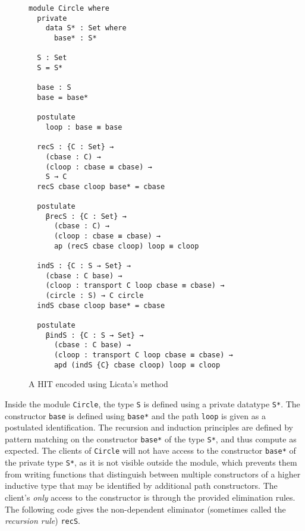 \documentclass[sigplan,10pt]{acmart}
\begin{document}
\begin{figure}
\begin{center}
\begingroup
\begin{Verbatim}
module Circle where
  private
    data S* : Set where
      base* : S*

  S : Set
  S = S*

  base : S
  base = base*

  postulate
    loop : base ≡ base

  recS : {C : Set} →
    (cbase : C) →
    (cloop : cbase ≡ cbase) →
    S → C
  recS cbase cloop base* = cbase

  postulate
    βrecS : {C : Set} →
      (cbase : C) →
      (cloop : cbase ≡ cbase) →
      ap (recS cbase cloop) loop ≡ cloop

  indS : {C : S → Set} →
    (cbase : C base) →
    (cloop : transport C loop cbase ≡ cbase) →
    (circle : S) → C circle
  indS cbase cloop base* = cbase

  postulate
    βindS : {C : S → Set} →
      (cbase : C base) →
      (cloop : transport C loop cbase ≡ cbase) →
      apd (indS {C} cbase cloop) loop ≡ cloop
\end{Verbatim}
\endgroup
\end{center}
\caption{A HIT encoded using Licata's method}
\label{fig:circle-hit}
\end{figure}

Inside the module {\tt Circle}, the type {\tt S} is defined using a private datatype {\tt S*}.
The constructor {\tt base} is defined using {\tt base*} and the path {\tt loop} is given as a postulated identification.
The recursion and induction principles are defined by pattern matching on the constructor {\tt base*} of the type {\tt S*}, and thus compute as expected.
The clients of {\tt Circle} will not have access to the constructor {\tt base*} of the private type {\tt S*}, as it is not visible outside the module, which prevents them from writing functions that distinguish between multiple constructors of a higher inductive type that may be identified by additional path constructors.
The client's \emph{only} access to the constructor is through the provided elimination rules. The following code gives the non-dependent eliminator (sometimes called the \emph{recursion rule}) {\tt recS}.
\end{document}
